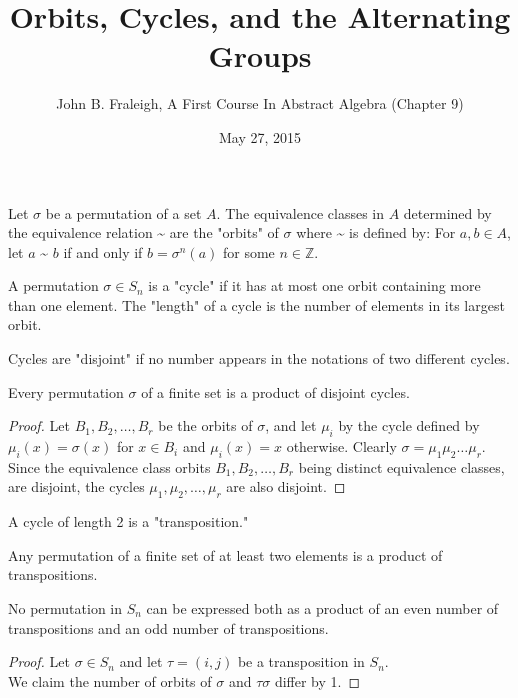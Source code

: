\documentclass[a4paper,11pt]{article}
\title{Orbits, Cycles, and the Alternating Groups}
\author{John B. Fraleigh, A First Course In Abstract Algebra (Chapter 9)}
\date{May 27, 2015}
\begin{document}
\maketitle
{}

\begin{outline}

    Let \(\sigma\) be a permutation of a set \(A\). The equivalence classes 
    in \(A\) determined by the equivalence relation \textasciitilde{} are the "orbits" of \(\sigma\) where
    \textasciitilde{} is defined by: For \(a, b \in A\), let \(a\) \textasciitilde{} \(b\) if and only 
    if \(b = \sigma^{n}(a)\) for some \(n \in \mathbb{Z}\).
    
    A permutation \(\sigma \in S_{n}\) is a "cycle" if it has at most one orbit containing more than one 
    element. The "length" of a cycle is the number of elements in its largest orbit.
    
    Cycles are "disjoint" if no number appears in the notations of two different
    cycles.
    
    Every permutation \(\sigma\) of a finite set is a product of disjoint cycles.
    
    \begin{proof}
      Let \(B_{1}, B_{2}, \ldots, B_{r}\) be the orbits of \(\sigma\), and let \(\mu_{i}\) 
      by the cycle defined by \(\mu_{i}(x) = \sigma(x)\) for \(x \in B_{i}\) and \(\mu_{i}(x) = x\) otherwise.
      Clearly \(\sigma = \mu_{1}\mu_{2}\ldots\mu_{r}\). Since the equivalence class orbits \(B_{1}, B_{2}, \ldots,
      B_{r}\) being distinct equivalence classes, are disjoint, the cycles \(\mu_{1}, \mu_{2}, \ldots, \mu_{r}\) are
      also disjoint.
    \end{proof}
    
    A cycle of length 2 is a "transposition."
    
    Any permutation of a finite set of at least two elements is a product of transpositions.
    
    No permutation in \(S_{n}\) can be expressed both as a product of an even number of transpositions 
    and an odd number of transpositions.
    
    \begin{proof}
      Let \(\sigma \in S_{n}\) and let \(\tau = (i, j)\) be a transposition in \(S_{n}\).\\
      We claim the number of orbits of \(\sigma\) and \(\tau\sigma\) differ by 1.
      

\end{proof}
\end{outline}
\end{document}
